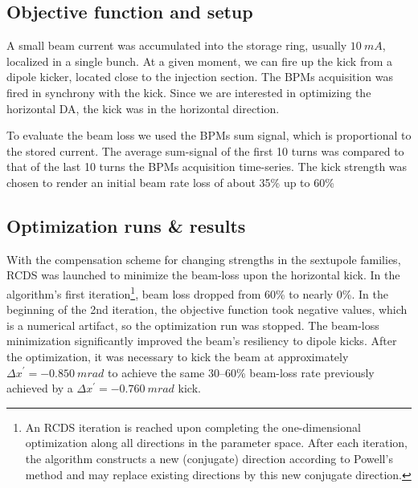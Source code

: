 \subsection{Objective function and setup}
A small beam current was accumulated into the storage ring, usually $10~\unit{mA}$, localized in a single bunch. At a given moment, we can fire up the kick from a dipole kicker, located close to the injection section. The BPMs acquisition was fired in synchrony with the kick. Since we are interested in optimizing the horizontal DA, the kick was in the horizontal direction.

To evaluate the beam loss we used the BPMs sum signal, which is proportional to the stored current. The average sum-signal of the first 10 turns was compared to that of the last 10 turns the BPMs acquisition time-series. The kick strength was chosen to render an initial beam rate loss of about 35\% up to 60\%
\subsection{Optimization runs \& results}
With the compensation scheme for changing strengths in the sextupole families, RCDS was launched to minimize the beam-loss upon the horizontal kick. In the algorithm's first iteration\footnote{An RCDS iteration is reached upon completing the one-dimensional optimization along all directions in the parameter space. After each iteration, the algorithm constructs a new (conjugate) direction according to Powell's method and may replace existing directions by this new conjugate direction.}, beam loss dropped from 60\% to nearly 0\%. In the beginning of the 2nd iteration, the objective function took negative values, which is a numerical artifact, so the optimization run was stopped. The beam-loss minimization significantly improved the beam's resiliency to dipole kicks. After the optimization, it was necessary to kick the beam at approximately $\Delta x^\prime=-0.850~\unit{m rad}$ to achieve the same  30--60\% beam-loss rate previously achieved by a $\Delta x^\prime=-0.760~\unit{m rad}$ kick.

